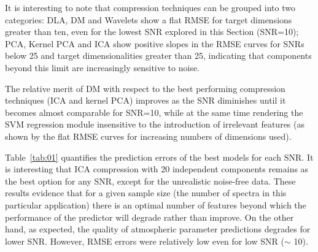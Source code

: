 \documentclass[a4paper,fleqn,usenatbib]{mnras}
\begin{document}
{{{It is interesting to note that compression techniques can be grouped
into two categories: DLA, DM and Wavelets show a flat RMSE for target
dimensions greater than ten, even for the lowest SNR explored in this
Section (SNR=10); PCA, Kernel PCA and ICA show positive slopes in the
RMSE curves for SNRs below 25 and target dimensionalities greater than
25, indicating that components beyond this limit are increasingly
sensitive to noise. 

The relative merit of DM with respect to the best
performing compression techniques (ICA and kernel PCA) improves as the
SNR diminishes until it becomes almost comparable for SNR=10, while at
the same time rendering the SVM regression module insensitive to the
introduction of irrelevant features (as shown by the flat RMSE curves
for increasing numbers of dimensions used). 

Table~\ref{tab:01} quantifies the prediction errors of the best models
for each SNR. It is interesting that ICA compression with 20
independent components remains as the best option for any SNR, except
for the unrealistic noise-free data. 
These results evidence that for a given sample
size (the number of spectra in this particular application) there is
an optimal number of features beyond which the performance of the
predictor will degrade rather than improve.  On the other hand, as
expected, the quality of atmospheric parameter predictions degrades 
for lower SNR. However, RMSE errors were relatively low even for 
low SNR ($\sim$ 10).  

}}}
\end{document}
